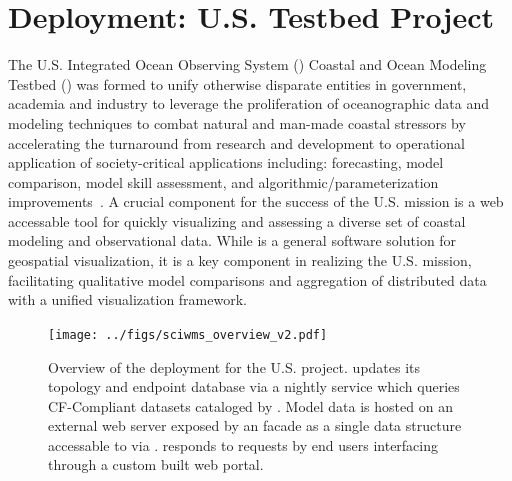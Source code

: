 \section{\sciwms{} Deployment: U.S. \ioos{} \comt{} Testbed Project}
\label{sec:ioos}
The U.S. Integrated Ocean Observing System (\ioos{}) Coastal and Ocean
Modeling Testbed (\comt{}) was formed to unify otherwise disparate
entities in government, academia and industry to leverage the
proliferation of oceanographic data and modeling techniques to combat
natural and man-made coastal stressors by accelerating the turnaround
from research and development to operational application of
society-critical applications including: forecasting, model
comparison, model skill assessment, and algorithmic/parameterization
improvements~\cite{luettich13}. A crucial component for the success of
the U.S. \ioos{} \comt{} mission is a web accessable tool for quickly
visualizing and assessing a diverse set of coastal modeling and
observational data. While \sciwms{} is a general software solution for
geospatial visualization, it is a key component in realizing the
U.S. \ioos{} \comt{} mission, facilitating qualitative model
comparisons and aggregation of distributed data with a unified
visualization framework.
\begin{figure}[ht!]
  \centering
  \texttt{[image: ../figs/sciwms\_overview\_v2.pdf]}
  \caption{Overview of the \sciwms{} deployment for the U.S. \ioos{}
    \comt{} project. \Sciwms{} updates its topology and endpoint
    database via a nightly service which queries CF-Compliant datasets
    cataloged by \ngdc{}. Model data is hosted on an external web
    server exposed by an \ncml{} facade as a single \netcdf{} data
    structure accessable to \sciwms{} via \opendap{}. \Sciwms{}
    responds to requests by end users interfacing through a custom built
    web portal.}
  \label{fig:overview1}
\end{figure}
